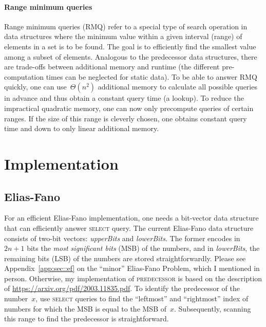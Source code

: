 \documentclass[a4paper,UKenglish,cleveref, autoref, thm-restate]{lipics-v2021}
\begin{document}
	\paragraph*{Range minimum queries}
	Range minimum queries (RMQ) refer to a special type of search operation in data structures where the minimum value within a given interval (range) of elements in a set is to be found. The goal is to efficiently find the smallest value among a subset of elements. Analogous to the predecessor data structures, there are trade-offs between additional memory and runtime (the different pre-computation times can be neglected for static data). To be able to answer RMQ quickly, one can use~$\Theta\left(n^2\right)$ additional memory to calculate all possible queries in advance and thus obtain a constant query time (a lookup). To reduce the impractical quadratic memory, one can now only precompute queries of certain ranges. If the size of this range is cleverly chosen, one obtains constant query time and down to only linear additional memory.
	
	\section{Implementation}
	
	\subsection{Elias-Fano}
	For an efficient Elias-Fano implementation, one needs a bit-vector data structure that can efficiently answer \textsc{select} query. The current Elias-Fano data structure consists of two-bit vectors: \textit{upperBits} and \textit{lowerBits}. The former encodes in~$2n+1$ bits the \textit{most significant bits} (MSB) of the numbers, and in \textit{lowerBits}, the remaining bits (LSB) of the numbers are stored straightforwardly. Please see Appendix~\ref{app:sec::ef} on the ``minor'' Elias-Fano Problem, which I mentioned in person. Otherwise, my implementation of \textsc{predecessor} is based on the description of \url{https://arxiv.org/pdf/2003.11835.pdf}. To identify the predecessor of the number~$x$, use \textsc{select} queries to find the ``leftmost'' and ``rightmost'' index of numbers for which the MSB is equal to the MSB of~$x$. Subsequently, scanning this range to find the predecessor is straightforward.
\end{document}
